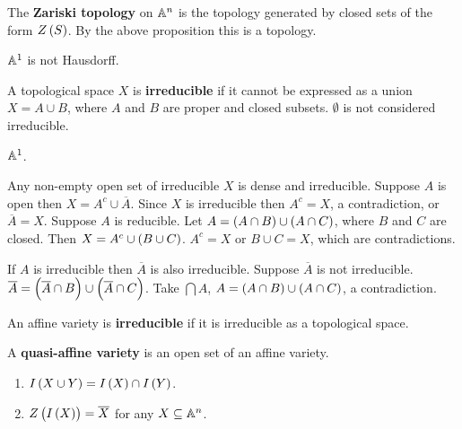 \begin{definition}
The \textbf{Zariski topology} on $ \mathbb{A}^n $ is the topology generated by closed sets of the form $ Z\br{S} $. By the above proposition this is a topology.
\end{definition}

\begin{example}
$ \mathbb{A}^1 $ is not Hausdorff.
\end{example}

\begin{definition}
A topological space $ X $ is \textbf{irreducible} if it cannot be expressed as a union $ X = A \cup B $, where $ A $ and $ B $ are proper and closed subsets. $ \emptyset $ is not considered irreducible.
\end{definition}

\begin{example}
$ \mathbb{A}^1 $.
\end{example}

\begin{example}
Any non-empty open set of irreducible $ X $ is dense and irreducible. Suppose $ A $ is open then $ X = A^c \cup \overline{A} $. Since $ X $ is irreducible then $ A^c = X $, a contradiction, or $ \overline{A} = X $. Suppose $ A $ is reducible. Let $ A = \br{A \cap B} \cup \br{A \cap C} $, where $ B $ and $ C $ are closed. Then $ X = A^c \cup \br{B \cup C} $. $ A^c = X $ or $ B \cup C = X $, which are contradictions.
\end{example}

\begin{example}
If $ A $ is irreducible then $ \overline{A} $ is also irreducible. Suppose $ \overline{A} $ is not irreducible. $ \overline{A} = \br{\overline{A} \cap B} \cup \br{\overline{A} \cap C} $. Take $ \bigcap A $, $ A = \br{A \cap B} \cup \br{A \cap C} $, a contradiction.
\end{example}

\begin{definition}
An affine variety is \textbf{irreducible} if it is irreducible as a topological space.
\end{definition}

\begin{remark}
A \textbf{quasi-affine variety} is an open set of an affine variety.
\end{remark}

\pagebreak

\begin{proposition}
\hfill
\begin{enumerate}
\item $ I\br{X \cup Y} = I\br{X} \cap I\br{Y} $.
\item $ Z\br{I\br{X}} = \overline{X} $ for any $ X \subseteq \mathbb{A}^n $.
\end{enumerate}
\end{proposition}

